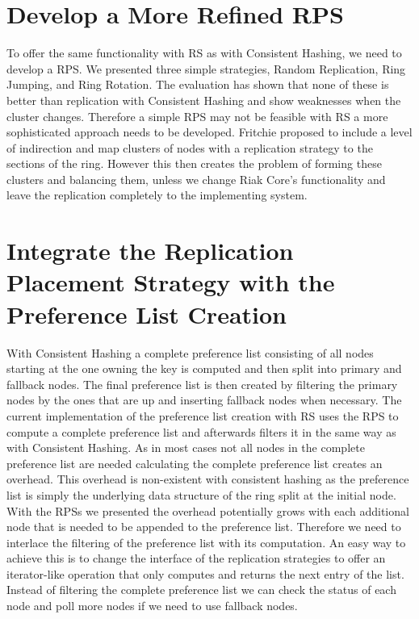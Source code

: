\section{Develop a More Refined \ac{RPS}}
To offer the same functionality with \ac{RS} as with Consistent Hashing, we need to develop a \ac{RPS}.
We presented three simple strategies, Random Replication, Ring Jumping, and Ring Rotation.
The evaluation has shown that none of these is better than replication with Consistent Hashing and show weaknesses when the cluster changes.
Therefore a simple \ac{RPS} may not be feasible with \ac{RS} a more sophisticated approach needs to be developed.
Fritchie\cite{Fritchie2018} proposed to include a level of indirection and map clusters of nodes with a replication strategy to the sections of the ring.
However this then creates the problem of forming these clusters and balancing them, unless we change Riak Core's functionality and leave the replication completely to the implementing system.


\section{Integrate the Replication Placement Strategy with the Preference List Creation}
With Consistent Hashing a complete preference list consisting of all nodes starting at the one owning the key is computed and then split into primary and fallback nodes.
The final preference list is then created by filtering the primary nodes by the ones that are up and inserting fallback nodes when necessary.
The current implementation of the preference list creation with \ac{RS} uses the \ac{RPS} to compute a complete preference list and afterwards filters it in the same way as with Consistent Hashing.
As in most cases not all nodes in the complete preference list are needed calculating the complete preference list creates an overhead.
This overhead is non-existent with consistent hashing as the preference list is simply the underlying data structure of the ring split at the initial node.
With the \acp{RPS} we presented the overhead potentially grows with each additional node that is needed to be appended to the preference list.
Therefore we need to interlace the filtering of the preference list with its computation.
An easy way to achieve this is to change the interface of the replication strategies to offer an iterator-like operation that only computes and returns the next entry of the list.
Instead of filtering the complete preference list we can check the status of each node and poll more nodes if we need to use fallback nodes.


